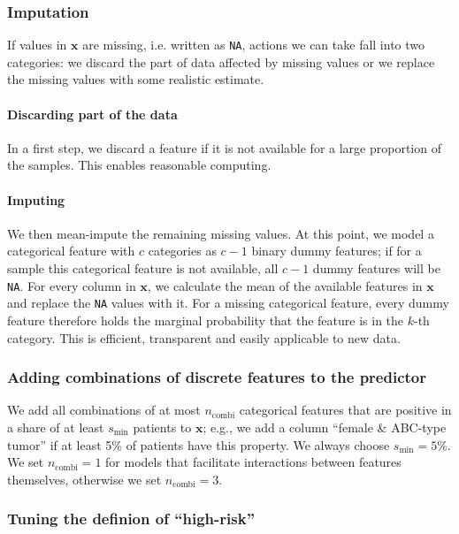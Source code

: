\subsubsection{Imputation}

If values in $\mathbf{x}$ are missing, i.e. written as \texttt{NA}, actions we can take fall into two 
categories: we discard the part of data affected by missing values or we replace the missing values 
with some realistic estimate.

\paragraph{Discarding part of the data}

In a first step, we discard a feature if it is not available for a large proportion of the samples.
This enables reasonable computing.

\paragraph{Imputing}

We then mean-impute the remaining missing values. At this point, we model a categorical feature 
with $c$ categories as $c-1$ binary dummy features; if for a sample this categorical feature is not 
available, all $c-1$ dummy features will be \texttt{NA}. For every column in $\mathbf{x}$, we calculate the 
mean of the available features in $\mathbf{x}$ and replace the \texttt{NA} values with it. 
For a missing categorical feature, every dummy feature therefore holds the marginal probability 
that the feature is in the $k$-th category. This is efficient, transparent and easily applicable to 
new data.

\subsubsection{Adding combinations of discrete features to the predictor}

We add all combinations of at most $n_\text{combi}$ categorical features that are positive in a 
share of at least $s_\text{min}$ patients to $\mathbf{x}$; e.g., we add a column ``female \& ABC-type 
tumor'' if at least \num{5}\% of patients have this property. We always choose $s_\text{min}
= 5\%$. We set $n_\text{combi} = 1$ for models that facilitate interactions between features 
themselves, otherwise we set $n_\text{combi} = 3$.

\subsubsection{Tuning the definion of ``high-risk''}

